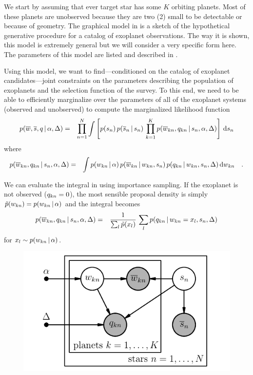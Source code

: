 \documentclass[12pt,preprint]{aastex}
\begin{document}
We start by assuming that ever target star has some $K$ orbiting planets.
Most of these planets are unobserved because they are two (2) small to be
detectable or because of geometry.
The graphical model in  is a sketch of the hypothetical generative
procedure for a catalog of exoplanet observations.
The way it is shown, this model is extremely general but we will consider a
very specific form here.
The parameters of this model are listed and described in .

Using this model, we want to find---conditioned on the catalog of exoplanet
candidates---joint constraints on the parameters describing the population of
exoplanets and the selection function of the survey.
To this end, we need to be able to efficiently marginalize over the parameters
of all of the exoplanet systems (observed and unobserved) to compute the
marginalized likelihood function
\begin{eqnarray}
p(\overline{w},\overline{s},q\,|\,\alpha,\Delta) &=&
\prod_{n=1}^N \int \left [
p(s_n)\,p(\overline{s}_n\,|\,s_n) \,
 \prod_{k=1}^K
p(\overline{w}_{kn},q_{kn}\,|\,s_n,\alpha,\Delta)\right ]
\,\mathrm{d} s_n
\end{eqnarray}
where
\begin{eqnarray}\eqlabel{planet-marg}
p(\planetobs_{kn},\isobs_{kn}\,|\,\stellar_n,\population,\selection) &=&
\int
p(\planet_{kn}\,|\,\population) \,
p(\planetobs_{kn}\,|\,\planet_{kn},\stellar_{n}) \,
p(\isobs_{kn}\,|\,\planet_{kn},\stellar_{n},\selection)
\dd \planet_{kn} \quad.
\end{eqnarray}

We can evaluate the integral in  using importance sampling.
If the exoplanet is not observed ($q_{kn}=0$), the most sensible proposal
density is simply $\tilde{p}(w_{kn})=p(w_{kn}\,|\,\alpha)$
and the integral becomes
\begin{eqnarray}
p(\overline{w}_{kn},q_{kn}\,|\,s_n,\alpha,\Delta) &=&
\frac{1}{\sum_l \tilde{p}(x_l)}\,\sum_l
p(q_{kn}\,|\,w_{kn}=x_l,s_{n},\Delta)
\end{eqnarray}
for $x_l \sim p(w_{kn}\,|\,\alpha)$.

\begin{figure}[htbp]
\begin{center}
    \includegraphics{gm.pdf}
\end{center}
\caption{%
}
\end{figure}
\end{document}
